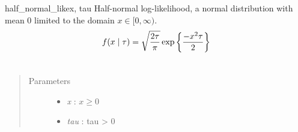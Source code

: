 \hypertarget{pymc.distributions.half_normal_like}{}\begin{funcdesc}{half\_normal\_like}{x, tau}
Half-normal log-likelihood, a normal distribution with mean 0 limited
to the domain $x \in [0, \infty)$.
\begin{gather}
\begin{split}f(x \mid \tau) = \sqrt{\frac{2\tau}{\pi}}\exp\left\{ {\frac{-x^2 \tau}{2}}\right\}\end{split}\notag\\\begin{split}\end{split}\notag
\end{gather}\begin{quote}\begin{description}
\item[Parameters] \leavevmode\begin{itemize}
\item {} 
\emph{x} : $x \ge 0$

\item {} 
\emph{tau} : tau \textgreater{} 0

\end{itemize}

\end{description}\end{quote}
\end{funcdesc}

